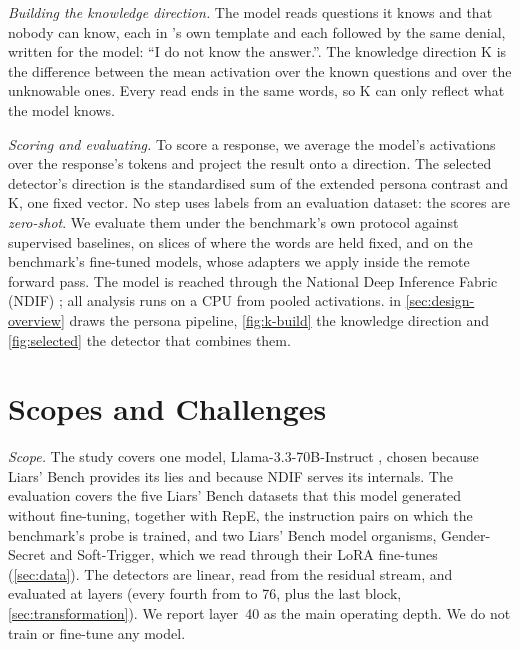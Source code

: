 \emph{Building the knowledge direction.} The model reads  questions it knows and
 that nobody can know, each in \hpkr's own template and each followed by the same
denial, written for the model: ``I do not know the answer.''. The knowledge direction K is the
difference between the mean activation over the known questions and over the unknowable ones. Every
read ends in the same words, so K can only reflect what the model knows.

\emph{Scoring and evaluating.} To score a response, we average the model's activations over the
response's tokens and project the result onto a direction. The selected detector's direction is the
standardised sum of the extended persona contrast and K, one fixed vector. No step uses labels from an
evaluation dataset: the scores are \emph{zero-shot}. We
evaluate them under the benchmark's own protocol against supervised baselines, on slices of \hpkr{}
where the words are held fixed, and on the benchmark's fine-tuned models, whose adapters we apply
inside the remote forward pass. The model is reached through the National Deep Inference Fabric
(NDIF) \cite{fiottokaufman2024nnsight}; all analysis runs on a CPU from pooled activations.
 in \cref{sec:design-overview} draws the persona pipeline, \cref{fig:k-build}
the knowledge direction and \cref{fig:selected} the detector that combines them.

\section{Scopes and Challenges}
\label{sec:scope}

\emph{Scope.} The study covers one model, Llama-3.3-70B-Instruct \cite{meta2024llama33}, chosen
because Liars' Bench provides its lies and because NDIF serves its internals. The evaluation covers
the five Liars' Bench datasets that this model generated without fine-tuning, together with RepE, the
instruction pairs on which the benchmark's probe is trained, and two Liars' Bench model organisms,
Gender-Secret and Soft-Trigger, which we read through their LoRA fine-tunes (\cref{sec:data}). The
detectors are linear, read from the residual stream, and evaluated at  layers (every
fourth from  to 76, plus the last block, \cref{sec:transformation}). We report layer~40
as the main operating depth. We do not train or fine-tune any model.

